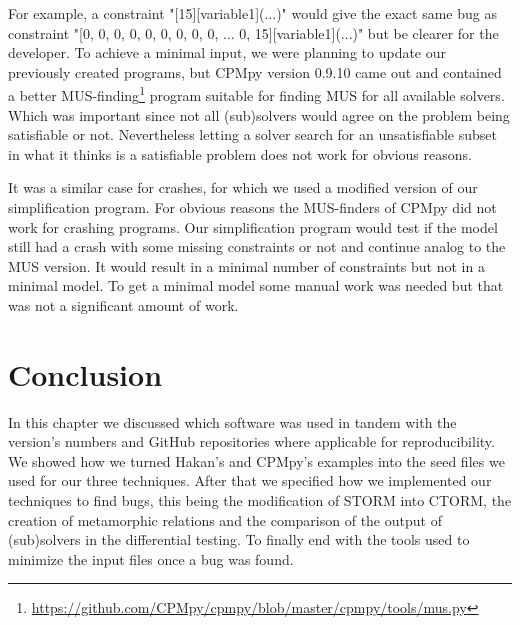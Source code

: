 For example, a constraint "[15][variable1](...)" would give the exact same bug as constraint "[0, 0, 0, 0, 0, 0, 0, 0, 0, ... 0, 15][variable1](...)" but be clearer for the developer. To achieve a minimal input, we were planning to update our previously created programs, but CPMpy version 0.9.10 came out and contained a better MUS-finding\footnote{\url{https://github.com/CPMpy/cpmpy/blob/master/cpmpy/tools/mus.py}} program  suitable for finding MUS for all available solvers. Which was important since not all (sub)solvers would agree on the problem being satisfiable or not. Nevertheless letting a solver search for an unsatisfiable subset in what it thinks is a satisfiable problem does not work for obvious reasons.


It was a similar case for crashes, for which we used a modified version of our simplification program. For obvious reasons the MUS-finders of CPMpy did not work for crashing programs. Our simplification program would test if the model still had a crash with some missing constraints or not and continue analog to the MUS version. It would result in a minimal number of constraints but not in a minimal model. To get a minimal model some manual work was needed but that was not a significant amount of work. 



\section{Conclusion}
\label{impl:conclusion}
In this chapter we discussed which software was used in tandem with the version's numbers and GitHub repositories where applicable for reproducibility. We showed how we turned Hakan's and CPMpy's examples into the seed files we used for our three techniques. After that we specified how we implemented our techniques to find bugs, this being the modification of STORM into CTORM, the creation of metamorphic relations and the comparison of the output of (sub)solvers in the differential testing. To finally end with the tools used to minimize the input files once a bug was found.


